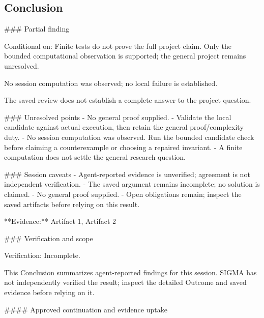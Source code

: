 \documentclass[11pt]{article}
\begin{document}
\subsection{Conclusion}
\#\#\# Partial finding

Conditional on: Finite tests do not prove the full project claim. Only the bounded computational observation is supported; the general project remains unresolved.

No session computation was observed; no local failure is established.

The saved review does not establish a complete answer to the project question.

\#\#\# Unresolved points
- No general proof supplied.
- Validate the local candidate against actual execution, then retain the general proof/complexity duty.
- No session computation was observed. Run the bounded candidate check before claiming a counterexample or choosing a repaired invariant.
- A finite computation does not settle the general research question.

\#\#\# Session caveats
- Agent-reported evidence is unverified; agreement is not independent verification.
- The saved argument remains incomplete; no solution is claimed.
- No general proof supplied.
- Open obligations remain; inspect the saved artifacts before relying on this result.

**Evidence:** Artifact 1, Artifact 2

\#\#\# Verification and scope

Verification: Incomplete.

This Conclusion summarizes agent-reported findings for this session. SIGMA has not independently verified the result; inspect the detailed Outcome and saved evidence before relying on it.

\#\#\#\# Approved continuation and evidence uptake
\end{document}

